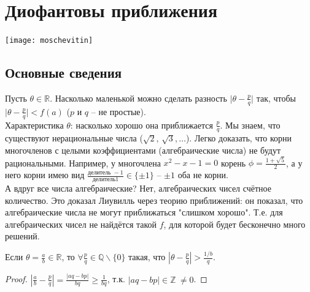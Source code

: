\newpage

\section{Диофантовы приближения}
\texttt{[image: moschevitin]}~\\

\subsection{Основные сведения}
	Пусть $\theta \in \mathbb{R}$. Насколько маленькой можно сделать разность $\lvert \theta - \frac{p}{q} \rvert$ так, чтобы $\lvert \theta - \frac{p}{q} \rvert < f(a)$ ($p$ и $q$ -- не простые).\\
	Характеристика $\theta$: насколько хорошо она приближается $\frac{p}{q}$. Мы знаем, что существуют нерациональные числа ($\sqrt{2}, \, \sqrt{3},\dots$). Легко доказать, что корни многочленов с целыми коэффициентами (алгебраические числа) не будут рациональными. Например, у многочлена $x^2 - x -1 =0$ корень $\phi = \frac{1+\sqrt{5}}{2}$, а у него корни имею вид $\frac{\text{делитель } -1}{\text{делитель} 1} \in \{ \pm 1 \}$ -- $\pm 1$ оба не корни.\\
	А вдруг все числа алгебраические? Нет, алгебраических чисел счётное количество. Это доказал Лиувилль через теорию приближений: он показал, что алгебраические числа не могут приближаться "слишком хорошо". Т.е. для алгебраических чисел не найдётся такой $f$, для которой будет бесконечно много решений.\\

\begin{statement}
	Если $\displaystyle \theta = \frac{a}{b} \in \mathbb{R}$, то $\displaystyle \forall \frac{p}{q} \in \mathbb{Q} \backslash \{ 0 \}$ такая, что 
	$\displaystyle \left| \theta - \frac{p}{q} \right| > \frac{1/b}{q}$.
\end{statement}
\begin{proof}
	$\displaystyle \left| \frac{a}{b} - \frac{p}{q} \right| = \frac{|aq - bp|}{bq} \geq \frac{1}{bq}$, т.к. $|aq-bp| \in \mathbb{Z} \ \ne 0$.
\end{proof}

